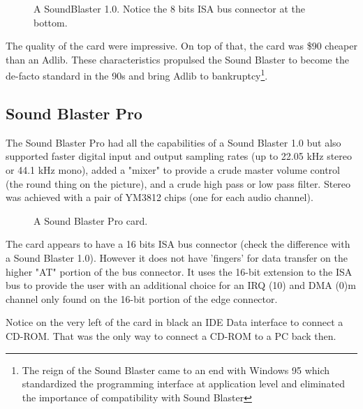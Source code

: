 \documentclass[book.tex]{subfiles}
\begin{document}
\begin{figure}[H] 
  \centering 
  \caption{A SoundBlaster 1.0. Notice the 8 bits ISA bus connector at the bottom.}
\end{figure}
\par
   The quality of the card were impressive. On top of that, the card was \$90 cheaper than an Adlib. These characteristics propulsed the Sound Blaster to become the de-facto standard in the 90s and bring Adlib to bankruptcy\footnote{The reign of the Sound Blaster came to an end with Windows 95 which standardized the programming interface at application level and eliminated the importance of compatibility with Sound Blaster}.


  \subsection{Sound Blaster Pro}
The Sound Blaster Pro had all the capabilities of a Sound Blaster 1.0 but also supported faster digital input and output sampling rates (up to 22.05 kHz stereo or 44.1 kHz mono), added a "mixer" to provide a crude master volume control (the round thing on the picture), and a crude high pass or low pass filter. Stereo was achieved with a pair of YM3812 chips (one for each audio channel).\\
\begin{figure}[H] 
  \centering 
  \caption{A Sound Blaster Pro card.}
\end{figure}
 The card appears to have a 16 bits ISA bus connector (check the difference with a Sound Blaster 1.0). However it does not have 'fingers' for data transfer on the higher "AT" portion of the bus connector. It uses the 16-bit extension to the ISA bus to provide the user with an additional choice for an IRQ (10) and DMA (0)m channel only found on the 16-bit portion of the edge connector.\\
\par
{} Notice on the very left of the card in black an IDE Data interface to connect a CD-ROM. That was the only way to connect a CD-ROM to a PC back then.
\end{document}
